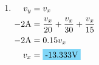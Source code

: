 \begin{enumerate}[leftmargin=2cm,labelsep=.5cm,label=\bfseries\alph*)]
	\item $
	\begin{aligned}[t]
	v_y &= v_x \\
	-2\qw{\A} &=\frac{v_x}{20}+\frac{v_x}{30}+\frac{v_x}{15} \\
	-2\qw{\A} &=0.15v_x \\
	v_x &= \hlbox{-13.333\qw{\V}}
	\end{aligned} $
	\\[1cm]
\end{enumerate}